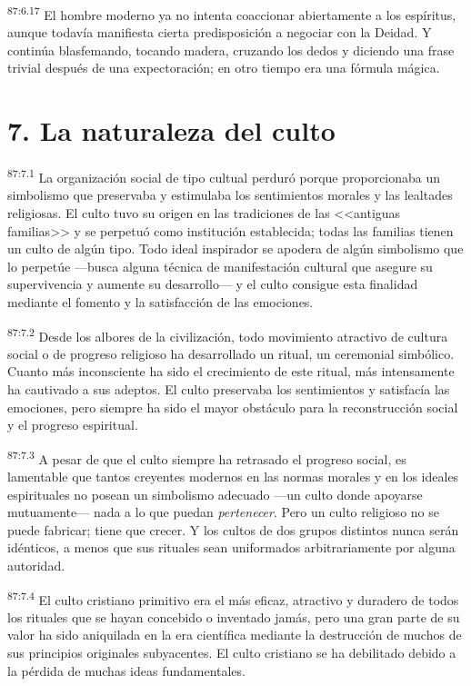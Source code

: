 \documentclass[twoside, 11pt]{book}
\begin{document}
\par
\textsuperscript{87:6.17} El hombre moderno ya no intenta coaccionar abiertamente a los espíritus, aunque todavía manifiesta cierta predisposición a negociar con la Deidad. Y continúa blasfemando, tocando madera, cruzando los dedos y diciendo una frase trivial después de una expectoración; en otro tiempo era una fórmula mágica.

\section*{7. La naturaleza del culto}
\par
\textsuperscript{87:7.1} La organización social de tipo cultual perduró porque proporcionaba un simbolismo que preservaba y estimulaba los sentimientos morales y las lealtades religiosas. El culto tuvo su origen en las tradiciones de las <<antiguas familias>> y se perpetuó como institución establecida; todas las familias tienen un culto de algún tipo. Todo ideal inspirador se apodera de algún simbolismo que lo perpetúe ---busca alguna técnica de manifestación cultural que asegure su supervivencia y aumente su desarrollo--- y el culto consigue esta finalidad mediante el fomento y la satisfacción de las emociones.

\par
\textsuperscript{87:7.2} Desde los albores de la civilización, todo movimiento atractivo de cultura social o de progreso religioso ha desarrollado un ritual, un ceremonial simbólico. Cuanto más inconsciente ha sido el crecimiento de este ritual, más intensamente ha cautivado a sus adeptos. El culto preservaba los sentimientos y satisfacía las emociones, pero siempre ha sido el mayor obstáculo para la reconstrucción social y el progreso espiritual.

\par
\textsuperscript{87:7.3} A pesar de que el culto siempre ha retrasado el progreso social, es lamentable que tantos creyentes modernos en las normas morales y en los ideales espirituales no posean un simbolismo adecuado ---un culto donde apoyarse mutuamente--- nada a lo que puedan \textit{pertenecer}. Pero un culto religioso no se puede fabricar; tiene que crecer. Y los cultos de dos grupos distintos nunca serán idénticos, a menos que sus rituales sean uniformados arbitrariamente por alguna autoridad.

\par
\textsuperscript{87:7.4} El culto cristiano primitivo era el más eficaz, atractivo y duradero de todos los rituales que se hayan concebido o inventado jamás, pero una gran parte de su valor ha sido aniquilada en la era científica mediante la destrucción de muchos de sus principios originales subyacentes. El culto cristiano se ha debilitado debido a la pérdida de muchas ideas fundamentales.
\end{document}
